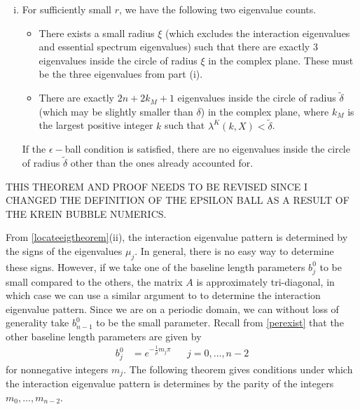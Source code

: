 \documentclass[thesis.tex]{subfiles}
\begin{document}
\begin{theorem}
\begin{enumerate}[(i)]
\item For sufficiently small $r$, we have the following two eigenvalue counts.
\begin{itemize}
	\item There exists a small radius $\xi$ (which excludes the interaction eigenvalues and essential spectrum eigenvalues) such that there are exactly 3 eigenvalues inside the circle of radius $\xi$ in the complex plane. These must be the three eigenvalues from part (i).

	\item There are exactly $2n + 2 k_M + 1$ eigenvalues inside the circle of radius $\tilde{\delta}$ (which may be slightly smaller than $\delta$) in the complex plane, where $k_M$ is the largest positive integer $k$ such that $\lambda^K(k,X) < \tilde{\delta}$. 
\end{itemize}

If the $\epsilon-$ball condition is satisfied, there are no eigenvalues inside the circle of radius $\tilde{\delta}$ other than the ones already accounted for.
\end{enumerate}
\end{theorem}

THIS THEOREM AND PROOF NEEDS TO BE REVISED SINCE I CHANGED THE DEFINITION OF THE EPSILON BALL AS A RESULT OF THE KREIN BUBBLE NUMERICS.

From \cref{locateeigtheorem}(ii), the interaction eigenvalue pattern is determined by the signs of the eigenvalues $\mu_j$. In general, there is no easy way to determine these signs. However, if we take one of the baseline length parameters $b_j^0$ to be small compared to the others, the matrix $A$ is approximately tri-diagonal, in which case we can use a similar argument to \cite[Theorem 3(iv)]{Sandstede1998} to determine the interaction eigenvalue pattern. Since we are on a periodic domain, we can without loss of generality take $b_{n-1}^0$ to be the small parameter. Recall from \cref{perexist} that the other baseline length parameters are given by
\begin{align*}
b_j^0 &= e^{-\frac{1}{\rho}m_j \pi} && j = 0, \dots, n-2
\end{align*}
for nonnegative integers $m_j$. The following theorem gives conditions under which the interaction eigenvalue pattern is determines by the parity of the integers $m_0, \dots, m_{n-2}$.
\end{document}
